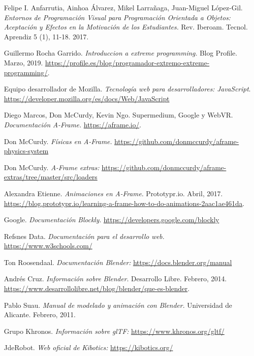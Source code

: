 \begin{thebibliography}{99}
    Felipe I. Anfarrutia, Ainhoa Álvarez, Mikel Larrañaga, Juan-Miguel López-Gil. \textit{Entornos de Programación Visual para Programación Orientada a Objetos: Aceptación y Efectos en la Motivación de los Estudiantes.} Rev. Iberoam. Tecnol. Aprendiz 5 (1), 11-18. 2017.
    
    Guillermo Rocha Garrido.
    \textit{Introduccion a extreme programming.} Blog Profile.
    Marzo, 2019.
    \url{https://profile.es/blog/programador-extremo-extreme-programming/}. 
  
    Equipo desarrollador de Mozilla.
    \textit{Tecnología web para desarrolladores: JavaScript}.
    \url{https://developer.mozilla.org/es/docs/Web/JavaScript}

    Diego Marcos, Don McCurdy, Kevin Ngo. Supermedium, Google y WebVR.
    \textit{Documentación A-Frame.}
    \url{https://aframe.io/}. 
    
    Don McCurdy.
    \textit{Físicas en A-Frame.}
    \url{https://github.com/donmccurdy/aframe-physics-system}
    
    Don McCurdy.
    \textit{A-Frame extras: }
    \url{https://github.com/donmccurdy/aframe-extras/tree/master/src/loaders}
    
    Alexandra Etienne.
    \textit{Animaciones en A-Frame.}
    Prototypr.io. Abril, 2017.
    \url{https://blog.prototypr.io/learning-a-frame-how-to-do-animations-2aac1ae461da}. 

    Google.
    \textit{Documentación Blockly.}
    \url{https://developers.google.com/blockly}
    
    Refsnes Data.
    \textit{Documentación para el desarrollo web.}
    \url{https://www.w3schools.com/}
    
    Ton Roosendaal.
    \textit{Documentación Blender: }
    \url{https://docs.blender.org/manual}
    
    Andrés Cruz.
    \textit{Información sobre Blender.}
     Desarrollo Libre. Febrero, 2014.
    \url{https://www.desarrollolibre.net/blog/blender/que-es-blender}.
    
    Pablo Suau.
    \textit{Manual de modelado y animación con Blender.}  Universidad de Alicante. Febrero, 2011.
    
    Grupo Khronos.
    \textit{Información sobre glTF: }
    \url{https://www.khronos.org/gltf/}
   
   JdeRobot.
    \textit{Web oficial de Kibotics:}  
    \url{https://kibotics.org/}

\end{thebibliography}